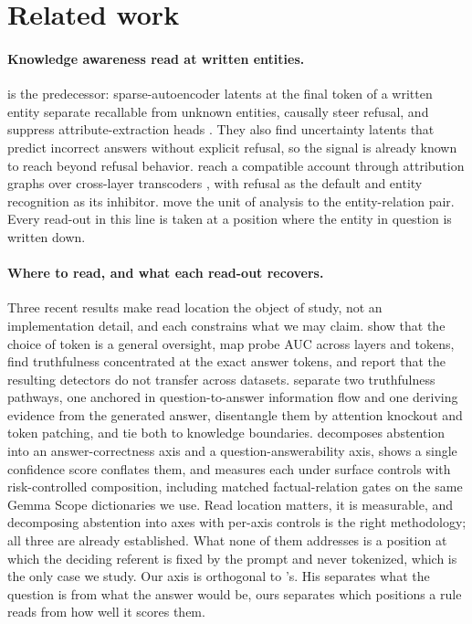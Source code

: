 \documentclass{article}
\begin{document}
\section{Related work}

\paragraph{Knowledge awareness read at written entities.} \citet{ferrando2025entity} is the
predecessor: sparse-autoencoder latents at the final token of a written entity separate recallable
from unknown entities, causally steer refusal, and suppress attribute-extraction heads
\citep{geva2023dissecting,nanda2023factfinding}. They also find uncertainty latents that predict
incorrect answers without explicit refusal, so the signal is already known to reach beyond refusal
behavior. \citet{lindsey2025biology} reach a compatible account through attribution graphs over
cross-layer transcoders \citep{ameisen2025circuittracing,marks2025sparsecircuits}, with refusal as
the default and entity recognition as its inhibitor. \citet{tamoyan2025factual} move the unit of
analysis to the entity-relation pair. Every read-out in this line is taken at a position where the
entity in question is written down.

\paragraph{Where to read, and what each read-out recovers.} Three recent results make read location
the object of study, not an implementation detail, and each constrains what we may claim.
\citet{orgad2025intrinsic} show that the choice of token is a general oversight, map probe AUC across
layers and tokens, find truthfulness concentrated at the exact answer tokens, and report that the
resulting detectors do not transfer across datasets. \citet{luo2026pathways} separate two
truthfulness pathways, one anchored in question-to-answer information flow and one deriving evidence
from the generated answer, disentangle them by attention knockout and token patching, and tie both to
knowledge boundaries. \citet{wagner2026twoaxes} decomposes abstention into an answer-correctness axis
and a question-answerability axis, shows a single confidence score conflates them, and measures each
under surface controls with risk-controlled composition, including matched factual-relation gates on
the same Gemma Scope dictionaries we use. Read location matters, it is measurable, and decomposing abstention into axes with per-axis controls
is the right methodology; all three are already established. What none of them addresses is a position
at which the deciding referent is fixed by the prompt and never tokenized, which is the only case we
study. Our axis is orthogonal to \citeauthor{wagner2026twoaxes}'s. His separates what the question is
from what the answer would be, ours separates which positions a rule reads from how well it scores
them.
\end{document}
